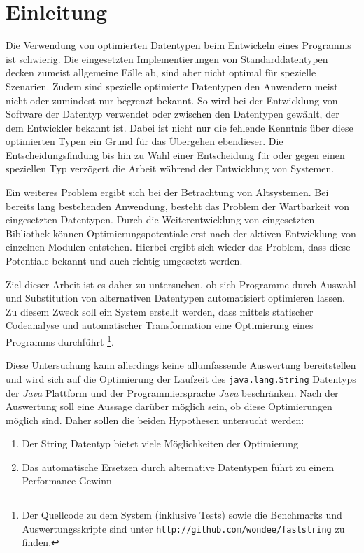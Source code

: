\chapter{Einleitung}
Die Verwendung von optimierten Datentypen beim Entwickeln eines Programms ist schwierig.
Die eingesetzten Implementierungen von Standarddatentypen decken zumeist allgemeine 
Fälle ab, sind aber nicht optimal für spezielle Szenarien. Zudem sind spezielle
optimierte Datentypen den Anwendern meist nicht oder zumindest nur begrenzt bekannt.
So wird bei der Entwicklung von Software der Datentyp verwendet oder zwischen den 
Datentypen gewählt, der dem Entwickler bekannt ist. Dabei ist nicht nur die fehlende 
Kenntnis über diese optimierten Typen ein Grund für das Übergehen ebendieser. Die 
Entscheidungsfindung bis hin zu Wahl einer Entscheidung für oder gegen einen speziellen
Typ verzögert die Arbeit während der Entwicklung von Systemen. 

Ein weiteres Problem ergibt sich bei der Betrachtung von Altsystemen. Bei bereits 
lang bestehenden Anwendung, besteht das Problem der Wartbarkeit von eingesetzten Datentypen. 
Durch die Weiterentwicklung von eingesetzten Bibliothek können Optimierungspotentiale
erst nach der aktiven Entwicklung von einzelnen Modulen entstehen. Hierbei ergibt sich
wieder das Problem, dass diese Potentiale bekannt und auch richtig umgesetzt werden.

Ziel dieser Arbeit ist es daher zu untersuchen, ob sich Programme durch Auswahl und 
Substitution von alternativen Datentypen automatisiert optimieren lassen. Zu diesem Zweck
soll ein System erstellt werden, dass mittels statischer Codeanalyse und automatischer
Transformation eine Optimierung eines Programms durchführt \footnote{Der Quellcode zu 
dem System (inklusive Tests) sowie die Benchmarks und Auswertungsskripte sind unter 
\texttt{http://github.com/wondee/faststring} zu finden.}.

Diese Untersuchung kann allerdings keine allumfassende Auswertung bereitstellen und wird 
sich auf die Optimierung der Laufzeit des \texttt{java.lang.String} Datentyps der 
\textit{Java} Plattform und der Programmiersprache \textit{Java} beschränken. Nach 
der Auswertung soll eine Aussage darüber möglich sein, ob diese Optimierungen möglich sind.
Daher sollen die beiden Hypothesen untersucht werden:
\\
\begin{enumerate}
	\item Der String Datentyp bietet viele Möglichkeiten der Optimierung
	\item Das automatische Ersetzen durch alternative Datentypen führt zu einem
	Performance Gewinn
\end{enumerate}

